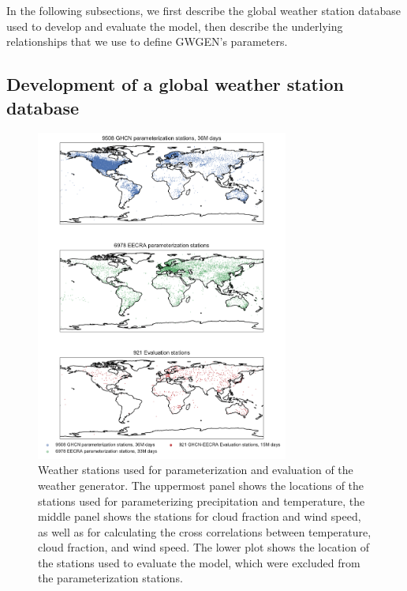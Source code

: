 \begin{refsection}
In the following subsections, we first describe the global weather station database used to develop and evaluate the model, then describe  the underlying relationships that we use to define GWGEN's parameters.

\subsection{Development of a global weather station database}

\begin{figure}
	\includegraphics[width=8.3cm]{Figures/f02.pdf}
	\caption[Weather stations used for parameterization and evaluation of the weather generator.]{Weather stations used for parameterization and evaluation of the weather generator. The uppermost panel shows the locations of the stations used for parameterizing precipitation and temperature, the middle panel shows the stations for cloud fraction and wind speed, as well as for calculating the cross correlations between temperature, cloud fraction, and wind speed. The lower plot shows the location of the stations used to evaluate the model, which were excluded from the parameterization stations.}
	\label{fig:stations}
\end{figure}


\end{refsection}

